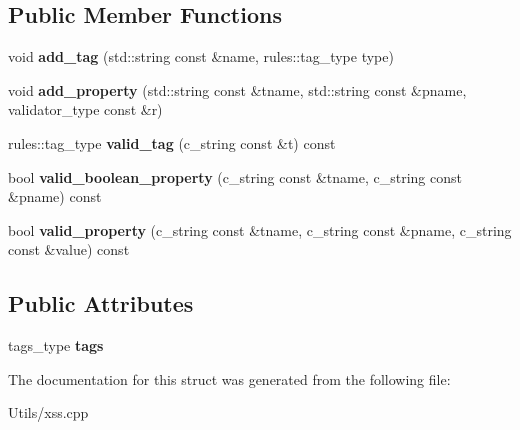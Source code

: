\subsection*{Public Member Functions}
\begin{DoxyCompactItemize}
\item 
\hypertarget{structcppcms_1_1xss_1_1rules__holder_a2d8a62e0f52591b90eb197379a62ce6e}{void {\bfseries add\-\_\-tag} (std\-::string const \&name, rules\-::tag\-\_\-type type)}\label{structcppcms_1_1xss_1_1rules__holder_a2d8a62e0f52591b90eb197379a62ce6e}

\item 
\hypertarget{structcppcms_1_1xss_1_1rules__holder_ab916bd75279af9aac27fe7f900c93ad7}{void {\bfseries add\-\_\-property} (std\-::string const \&tname, std\-::string const \&pname, validator\-\_\-type const \&r)}\label{structcppcms_1_1xss_1_1rules__holder_ab916bd75279af9aac27fe7f900c93ad7}

\item 
\hypertarget{structcppcms_1_1xss_1_1rules__holder_a50a710ac07196545595ab04a3bfa336c}{rules\-::tag\-\_\-type {\bfseries valid\-\_\-tag} (c\-\_\-string const \&t) const }\label{structcppcms_1_1xss_1_1rules__holder_a50a710ac07196545595ab04a3bfa336c}

\item 
\hypertarget{structcppcms_1_1xss_1_1rules__holder_aaef8428bd2134e3f91cfbfe11a1673b0}{bool {\bfseries valid\-\_\-boolean\-\_\-property} (c\-\_\-string const \&tname, c\-\_\-string const \&pname) const }\label{structcppcms_1_1xss_1_1rules__holder_aaef8428bd2134e3f91cfbfe11a1673b0}

\item 
\hypertarget{structcppcms_1_1xss_1_1rules__holder_afc45995f027d444a757c40b52041493b}{bool {\bfseries valid\-\_\-property} (c\-\_\-string const \&tname, c\-\_\-string const \&pname, c\-\_\-string const \&value) const }\label{structcppcms_1_1xss_1_1rules__holder_afc45995f027d444a757c40b52041493b}

\end{DoxyCompactItemize}
\subsection*{Public Attributes}
\begin{DoxyCompactItemize}
\item 
\hypertarget{structcppcms_1_1xss_1_1rules__holder_adbed4f33dd111c8eb305d09e49c941d3}{tags\-\_\-type {\bfseries tags}}\label{structcppcms_1_1xss_1_1rules__holder_adbed4f33dd111c8eb305d09e49c941d3}

\end{DoxyCompactItemize}


The documentation for this struct was generated from the following file\-:\begin{DoxyCompactItemize}
\item 
Utils/xss.\-cpp\end{DoxyCompactItemize}

